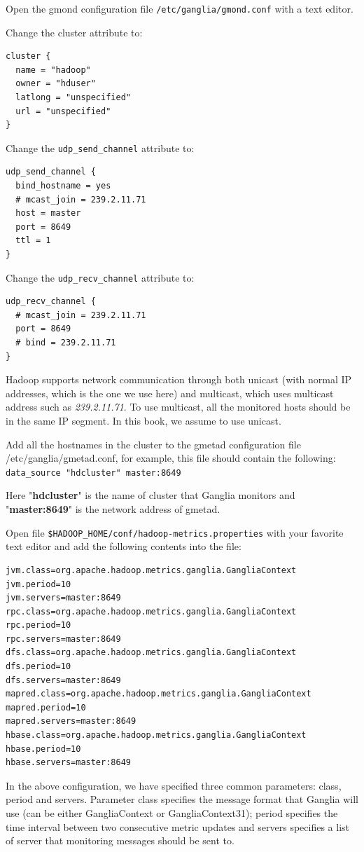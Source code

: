 Open the gmond configuration file \verb|/etc/ganglia/gmond.conf| with a text editor.

Change the cluster attribute to:
\begin{verbatim}
cluster {
  name = "hadoop"
  owner = "hduser"
  latlong = "unspecified"
  url = "unspecified"
}
\end{verbatim}

Change the \verb|udp_send_channel| attribute to: 
\begin{verbatim}
udp_send_channel {
  bind_hostname = yes
  # mcast_join = 239.2.11.71
  host = master
  port = 8649
  ttl = 1
}
\end{verbatim}

Change the \verb|udp_recv_channel| attribute to: 
\begin{verbatim}
udp_recv_channel {
  # mcast_join = 239.2.11.71
  port = 8649
  # bind = 239.2.11.71
}
\end{verbatim}

Hadoop supports network communication through both unicast (with normal IP addresses, which is the one we use here) and multicast, which uses multicast address such as \emph{239.2.11.71}. To use multicast, all the monitored hosts should be in the same IP segment. In this book, we assume to use unicast.

Add all the hostnames in the cluster to the gmetad configuration file /etc/ganglia/gmetad.conf, for example, this file should contain the following: \\
\verb|data_source "hdcluster" master:8649|

Here "\textbf{hdcluster}" is the name of cluster that Ganglia monitors and "\textbf{master:8649}" is the network address of gmetad.

Open file \verb|$HADOOP_HOME/conf/hadoop-metrics.properties| with your favorite text editor and add the following contents into the file:
\begin{verbatim}
jvm.class=org.apache.hadoop.metrics.ganglia.GangliaContext
jvm.period=10
jvm.servers=master:8649
rpc.class=org.apache.hadoop.metrics.ganglia.GangliaContext
rpc.period=10
rpc.servers=master:8649
dfs.class=org.apache.hadoop.metrics.ganglia.GangliaContext
dfs.period=10
dfs.servers=master:8649
mapred.class=org.apache.hadoop.metrics.ganglia.GangliaContext
mapred.period=10
mapred.servers=master:8649
hbase.class=org.apache.hadoop.metrics.ganglia.GangliaContext
hbase.period=10
hbase.servers=master:8649
\end{verbatim}

In the above configuration, we have specified three common parameters: class, period and servers. Parameter class specifies the message format that Ganglia will use (can be either GangliaContext or GangliaContext31); period specifies the time interval between two consecutive metric updates and servers specifies a list of server that monitoring messages should be sent to.

